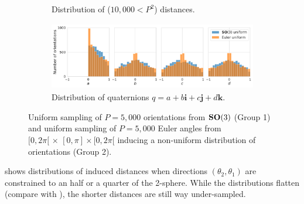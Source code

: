 \begin{figure}[ht!]
\begin{subfigure}[b]{0.36\linewidth}
        \caption{Distribution of ($10,000<P^2$) distances.}%
        \label{fig:orientation-sampling:distances}
    \end{subfigure}
    \hspace{1em}
    \begin{subfigure}[b]{0.46\linewidth}
        \centering
        \includegraphics[height=8em]{figures/uniform_quaternions_vs_angles_q.pdf}
        \caption{Distribution of quaternions $q = a + b\boldsymbol{i} + c\boldsymbol{j} + d\boldsymbol{k}$.}
    \end{subfigure}
    \caption{%
        Uniform sampling of $P=5,000$ orientations from $\mathrm{\mathbf{SO}}(3)$ (Group 1) and uniform sampling of $P=5,000$ Euler angles from $[0,2\pi[ \, \times \, [0,\pi] \times [0,2\pi[$ inducing a non-uniform distribution of orientations (Group 2).
    }\label{fig:orientation-sampling}
\end{figure}

 shows distributions of induced distances when directions $(\theta_2, \theta_1)$ are constrained to an half or a quarter of the 2-sphere.
While the distributions flatten (compare with ), the shorter distances are still way under-sampled.

